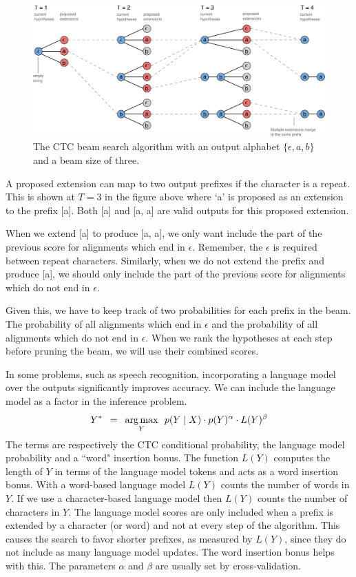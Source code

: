 \begin{figure}
\centering
\includegraphics[width=\textwidth]{background/figures/prefix_beam_search.pdf}
\caption{The CTC beam search algorithm with an output alphabet $\{\epsilon, a,
    b\}$ and a beam size of three.}
\end{figure}

A proposed extension can map to two output prefixes if the character is a
repeat. This is shown at $T=3$ in the figure above where `a’ is proposed as an
extension to the prefix [a]. Both [a] and [a, a] are valid outputs for this
proposed extension.

When we extend [a] to produce [a, a], we only want include the part of the
previous score for alignments which end in $\epsilon$. Remember, the $\epsilon$
is required between repeat characters. Similarly, when we do not extend the
prefix and produce [a], we should only include the part of the previous score
for alignments which do not end in $\epsilon$.

Given this, we have to keep track of two probabilities for each prefix in the
beam. The probability of all alignments which end in $\epsilon$ and the
probability of all alignments which do not end in $\epsilon$. When we rank the
hypotheses at each step before pruning the beam, we will use their combined
scores.

In some problems, such as speech recognition, incorporating a language model
over the outputs significantly improves accuracy. We can include the language
model as a factor in the inference problem.
\begin{align*}
Y^* \enspace = \enspace \operatorname*{arg\,max}_Y \enspace
        p(Y \mid X) \cdot p(Y)^\alpha \cdot L(Y)^\beta
\end{align*}
The terms are respectively the CTC conditional probability, the language model
probability and a ``word" insertion bonus. The function $L(Y)$ computes the
length of $Y$ in terms of the language model tokens and acts as a word
insertion bonus. With a word-based language model $L(Y)$ counts the number of
words in $Y$. If we use a character-based language model then $L(Y)$ counts the
number of characters in $Y$. The language model scores are only included when a
prefix is extended by a character (or word) and not at every step of the
algorithm. This causes the search to favor shorter prefixes, as measured by
$L(Y)$, since they do not include as many language model updates. The word
insertion bonus helps with this. The parameters $\alpha$ and $\beta$ are
usually set by cross-validation.

